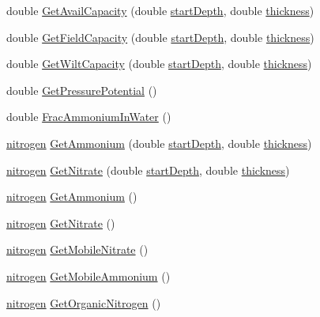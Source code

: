 \begin{DoxyCompactItemize}
\item 
double \hyperlink{classsoil_layer_a08cd2b12daf06c2cd45ef9bad249bdb9}{GetAvailCapacity} (double \hyperlink{classsoil_layer_acbee67e83ac96f6906c03498366616b6}{startDepth}, double \hyperlink{classsoil_layer_adaeedd67db3ed2312056db1469945ffa}{thickness})
\item 
double \hyperlink{classsoil_layer_a64c5886c99eaf6400f8668db437b1133}{GetFieldCapacity} (double \hyperlink{classsoil_layer_acbee67e83ac96f6906c03498366616b6}{startDepth}, double \hyperlink{classsoil_layer_adaeedd67db3ed2312056db1469945ffa}{thickness})
\item 
double \hyperlink{classsoil_layer_a722893625125bc8ab7be416118ed908e}{GetWiltCapacity} (double \hyperlink{classsoil_layer_acbee67e83ac96f6906c03498366616b6}{startDepth}, double \hyperlink{classsoil_layer_adaeedd67db3ed2312056db1469945ffa}{thickness})
\item 
double \hyperlink{classsoil_layer_a2e1226d73b8a72c05e1821aea577f983}{GetPressurePotential} ()
\item 
double \hyperlink{classsoil_layer_a45a1255f7f65f6f2ac3087b13061ee93}{FracAmmoniumInWater} ()
\item 
\hyperlink{classnitrogen}{nitrogen} \hyperlink{classsoil_layer_a6c55ade0e8450447467b46f13c169309}{GetAmmonium} (double \hyperlink{classsoil_layer_acbee67e83ac96f6906c03498366616b6}{startDepth}, double \hyperlink{classsoil_layer_adaeedd67db3ed2312056db1469945ffa}{thickness})
\item 
\hyperlink{classnitrogen}{nitrogen} \hyperlink{classsoil_layer_a35ebeffcc6514687cac1cb50dea2cad1}{GetNitrate} (double \hyperlink{classsoil_layer_acbee67e83ac96f6906c03498366616b6}{startDepth}, double \hyperlink{classsoil_layer_adaeedd67db3ed2312056db1469945ffa}{thickness})
\item 
\hyperlink{classnitrogen}{nitrogen} \hyperlink{classsoil_layer_aa5fa8a32edd6f42e0cb5fac607a65b29}{GetAmmonium} ()
\item 
\hyperlink{classnitrogen}{nitrogen} \hyperlink{classsoil_layer_a79f32d89dd310312e5974d2959c0c8c3}{GetNitrate} ()
\item 
\hyperlink{classnitrogen}{nitrogen} \hyperlink{classsoil_layer_aea200059c9f20c7c8583080eb088a0a0}{GetMobileNitrate} ()
\item 
\hyperlink{classnitrogen}{nitrogen} \hyperlink{classsoil_layer_ac8edbc242467d49754f2e9dd75e0f06c}{GetMobileAmmonium} ()
\item 
\hyperlink{classnitrogen}{nitrogen} \hyperlink{classsoil_layer_ab59162a095c3cc12c515b5e37f3b650a}{GetOrganicNitrogen} ()

\end{DoxyCompactItemize}
